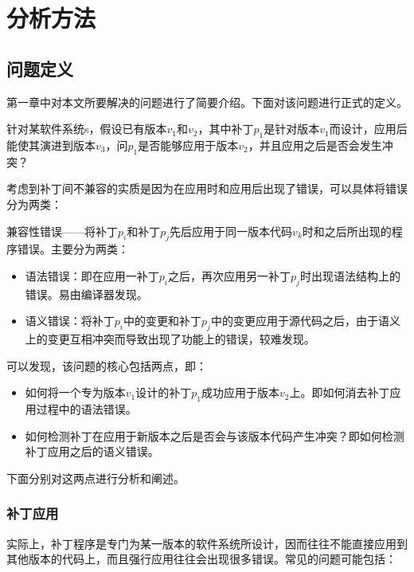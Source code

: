 \chapter{分析方法}
\section{问题定义}
\label {define_problem}
第一章中对本文所要解决的问题进行了简要介绍。下面对该问题进行正式的定义。

\begin{problem}
	\label {origin}
	针对某软件系统s，假设已有版本$v_1$和$v_2$，其中补丁$p_1$是针对版本$v_1$而设计，应用后能使其演进到版本$v_3$，问$p_1$是否能够应用于版本$v_{2}$，并且应用之后是否会发生冲突？
\end{problem}

考虑到补丁间不兼容的实质是因为在应用时和应用后出现了错误，可以具体将错误分为两类：

\begin{definition}
	兼容性错误——将补丁$p_i$和补丁$p_j$先后应用于同一版本代码$v_k$时和之后所出现的程序错误。主要分为两类：
	\begin{itemize}
		\item 语法错误：即在应用一补丁$p_i$之后，再次应用另一补丁$p_j$时出现语法结构上的错误。易由编译器发现。
		\item 语义错误：将补丁$p_i$中的变更和补丁$p_j$中的变更应用于源代码之后，由于语义上的变更互相冲突而导致出现了功能上的错误，较难发现。
	\end{itemize}
\end{definition}

可以发现，该问题的核心包括两点，即：
\begin{itemize}
	\item 如何将一个专为版本$v_1$设计的补丁$p_1$成功应用于版本$v_2$上。即如何消去补丁应用过程中的语法错误。
	\item 如何检测补丁在应用于新版本之后是否会与该版本代码产生冲突？即如何检测补丁应用之后的语义错误。
\end{itemize}

下面分别对这两点进行分析和阐述。

\subsection{补丁应用}

实际上，补丁程序是专门为某一版本的软件系统所设计，因而往往不能直接应用到其他版本的代码上，而且强行应用往往会出现很多错误。常见的问题可能包括：


